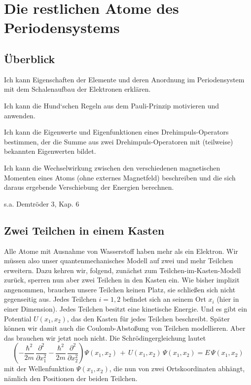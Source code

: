 \renewcommand{\lastmod}{15. November 2024}
\renewcommand{\chapterauthors}{Markus Lippitz}

\chapter{Die restlichen Atome des Periodensystems}



\section{Überblick}

Ich kann Eigenschaften der Elemente und deren Anordnung im Periodensystem mit dem Schalenaufbau der Elektronen erklären. 

Ich kann die Hund‘schen Regeln aus dem Pauli-Prinzip motivieren und anwenden.

Ich kann die Eigenwerte und Eigenfunktionen eines Drehimpuls-Operators bestimmen, der die Summe aus zwei Drehimpuls-Operatoren mit (teilweise) bekannten Eigenwerten bildet.

Ich kann die Wechselwirkung zwischen den verschiedenen magnetischen Momenten eines Atoms (ohne externes Magnetfeld) beschreiben und die sich daraus ergebende Verschiebung der Energien berechnen.


s.a. Demtröder 3, Kap. 6





\section{Zwei Teilchen in einem Kasten}

Alle Atome mit Ausnahme von Wasserstoff haben mehr als ein Elektron. Wir müssen also unser quantenmechanisches Modell auf zwei und mehr Teilchen erweitern. Dazu kehren wir, \cite{Harris_moderne_Physik} folgend, zunächst zum Teilchen-im-Kasten-Modell zurück, sperren nun aber zwei Teilchen in den Kasten ein. Wie bisher implizit angenommen, brauchen unsere Teilchen keinen Platz, sie schließen sich nicht gegenseitig aus. Jedes Teilchen $i=1,2$ befindet sich an seinem Ort $x_i$ (hier in einer Dimension). Jedes Teilchen besitzt eine kinetische Energie. Und es gibt ein Potential $U(x_1, x_2)$, das den Kasten für jedes Teilchen beschreibt. Später können wir damit auch die Coulomb-Abstoßung von Teilchen modellieren. Aber das brauchen wir jetzt noch nicht. Die Schrödingergleichung lautet
\begin{equation}
    \left(
        - \frac{\hbar^2}{2m} \, \frac{\partial^2}{\partial x_1^2} 
        - \frac{\hbar^2}{2m} \, \frac{\partial^2}{\partial x_2^2} 
     \right)
     \Psi(x_1, x_2)
     \, + \,
     U(x_1, x_2) \, \Psi(x_1, x_2)
     = E \, \Psi(x_1, x_2)
\end{equation}
mit der Wellenfunktion $\Psi(x_1, x_2)$, die nun von zwei Ortskoordinaten abhängt, nämlich den Positionen der beiden Teilchen.

